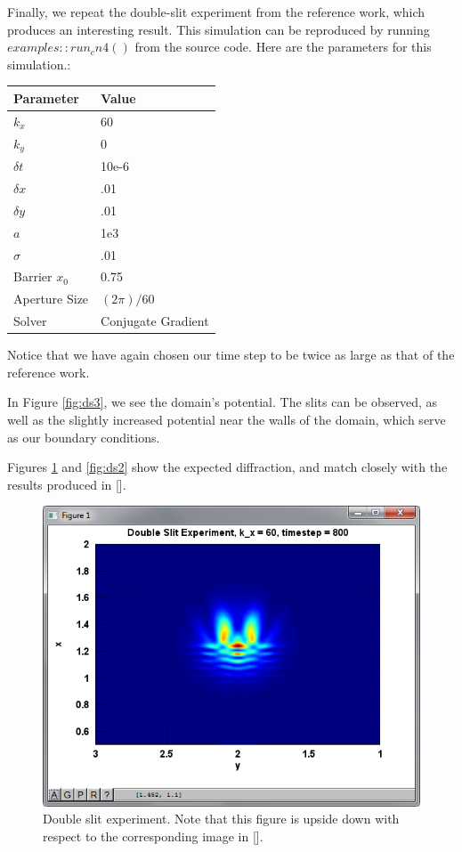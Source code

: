 \documentclass[letterpaper,12pt]{article}
\begin{document}
Finally, we repeat the double-slit experiment from the reference work, which produces an interesting result.  This simulation can be reproduced by running $examples::run_cn4()$ from the source code. Here are the parameters for this simulation.:

\begin{center}
    \begin{tabular}{ | l | l  |}
    \hline
    Parameter & Value  \\ \hline
	$k_x$ & 60  \\ \hline
	$k_y$ & 0  \\ \hline    
	$\delta t$ & 10e-6  \\ \hline    
    $\delta x$ & .01  \\ \hline    
    $\delta y$ & .01  \\ \hline 
 	$a$ & 1e3  \\ \hline    
    $\sigma$ & .01  \\ \hline  
    Barrier $x_0$ & 0.75 \\ \hline            
	Aperture Size & $(2\pi)/60$ \\ \hline            
    Solver & Conjugate Gradient  \\ \hline            
    \hline
    \end{tabular}
\end{center}

Notice that we have again chosen our time step to be twice as large as that of the reference work.  

In Figure \ref{fig:ds3}, we see the domain's potential.  The slits can be observed, as well as the slightly increased potential near the walls of the domain, which serve as our boundary conditions.

Figures \ref{fig:ds1} and \ref{fig:ds2} show the expected diffraction, and match closely with the results produced in [].

\begin{figure}[!htbp]
\centering
\includegraphics[scale=0.85,trim = 20mm 20mm 20mm 9mm,clip=true]{doubleslit800.png}
\caption{Double slit experiment.  Note that this figure is upside down with respect to the corresponding image in [].}
\label{fig:ds1}
\end{figure}
\end{document}
